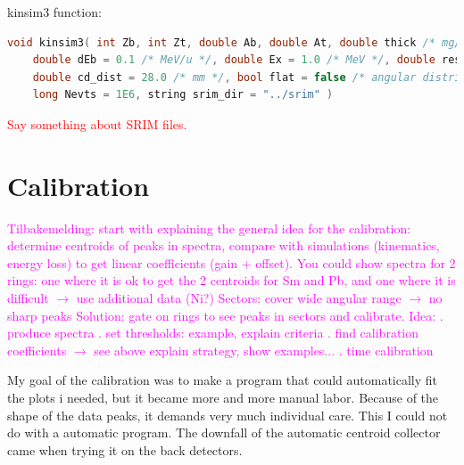 \documentclass[twoside,english]{uiofysmaster/uiofysmaster}
\begin{document}
kinsim3 function:
\begin{lstlisting}[language=c++]
void kinsim3( int Zb, int Zt, double Ab, double At, double thick /* mg/cm^2 */, double Eb /* MeV/u */,
    double dEb = 0.1 /* MeV/u */, double Ex = 1.0 /* MeV */, double res = 0.6 /* % */,
	double cd_dist = 28.0 /* mm */, bool flat = false /* angular distribution? */,
	long Nevts = 1E6, string srim_dir = "../srim" )
\end{lstlisting}

\bigskip

\textcolor{red}{Say something about SRIM files.}

\bigskip



\section{Calibration}

\textcolor{Magenta}{Tilbakemelding: \newline 
start with explaining the general idea for the calibration: \newline 
determine centroids of peaks in spectra, compare with simulations (kinematics, energy loss) to get linear coefficients (gain + offset). You could show spectra for 2 rings: one where it is ok to get the 2 centroids for Sm and Pb, and one where it is difficult $\rightarrow$ use additional data (Ni?) \newline
Sectors: cover wide angular range $\rightarrow$ no sharp peaks  \newline
Solution: gate on rings to see peaks in sectors and calibrate. \newline
Idea: . produce spectra . set thresholds: example, explain criteria . find calibration coefficients $\rightarrow$ see above \newline
explain strategy, show examples... . time calibration 
}


My goal of the calibration was to make a program that could automatically fit the plots i needed, but it became more and more manual labor. 
Because of the shape of the data peaks, it demands very much individual care. 
This I could not do with a automatic program. 
The downfall of the automatic centroid collector came when trying it on the back detectors. 
\end{document}
